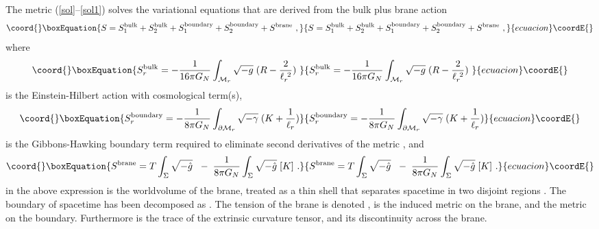 \documentclass[a4paper,12pt,oneside]{article}
\begin{document}
The metric (\ref{sol}--\ref{sol1}) solves the variational equations
that are derived from
the bulk plus brane action
\begin{equation}\coord{}\boxEquation{
S = S^{\rm bulk}_1 + S^{\rm bulk}_2  + S^{\rm boundary}_1 + S^{\rm boundary}_2
+ S^{\rm brane} \ ,
\label{total}
}{
S = S^{\rm bulk}_1 + S^{\rm bulk}_2  + S^{\rm boundary}_1 + S^{\rm boundary}_2
+ S^{\rm brane} \ ,
}{ecuacion}\coordE{}\end{equation}
where
\begin{equation}\coord{}\boxEquation{
S^{\rm bulk}_r  = -{1\over 16\pi G_N}\int_{{\cal M}_r} \sqrt{-g}\; ( R - {2\over
\ell_r^{\ 2}})\
\label{act}
}{
S^{\rm bulk}_r  = -{1\over 16\pi G_N}\int_{{\cal M}_r} \sqrt{-g}\; ( R - {2\over
\ell_r^{\ 2}})\
}{ecuacion}\coordE{}\end{equation}
is the Einstein-Hilbert action with cosmological term(s),
\begin{equation}\coord{}\boxEquation{
S^{\rm boundary}_r  = -{1\over 8\pi G_N}\int_{\partial{\cal M}_r}
\sqrt{-\gamma}\; ( K + {1\over \ell_r} )
\label{boundary}
}{
S^{\rm boundary}_r  = -{1\over 8\pi G_N}\int_{\partial{\cal M}_r}
\sqrt{-\gamma}\; ( K + {1\over \ell_r} )
}{ecuacion}\coordE{}\end{equation}
is the Gibbons-Hawking boundary term  required
to eliminate second derivatives of the metric \cite{GH},
and
\begin{equation}\coord{}\boxEquation{
S^{\rm brane} =  T\int_{\Sigma}\sqrt{-\hat g}\
\; -\; {1\over 8\pi G_N}\int_{\Sigma} \sqrt{-\hat g}\; [K]  \ .
\label{brane}
}{
S^{\rm brane} =  T\int_{\Sigma}\sqrt{-\hat g}\
\; -\; {1\over 8\pi G_N}\int_{\Sigma} \sqrt{-\hat g}\; [K]  \ .
}{ecuacion}\coordE{}\end{equation}
\vskip 0.15cm \noindent
 \myHighlight{$\Sigma$}\coordHE{} in the above expression is the
worldvolume of the brane,  treated as a thin shell
that  separates spacetime in two disjoint regions
\coordHE{}. The boundary of spacetime has been  decomposed as
  \myHighlight{$\partial{\cal M}_1 \cup
\partial{\cal M}_2 $}\coordHE{} .  The tension of the brane is denoted
\myHighlight{$T$}\coordHE{},   \coordHE{} is the induced metric on the brane, and
\myHighlight{$\gamma$}\coordHE{} the metric on the boundary. Furthermore
 \myHighlight{$K$}\coordHE{}  is the trace of the extrinsic curvature tensor,
and \myHighlight{$[K]$}\coordHE{} its discontinuity across the brane.
\end{document}
